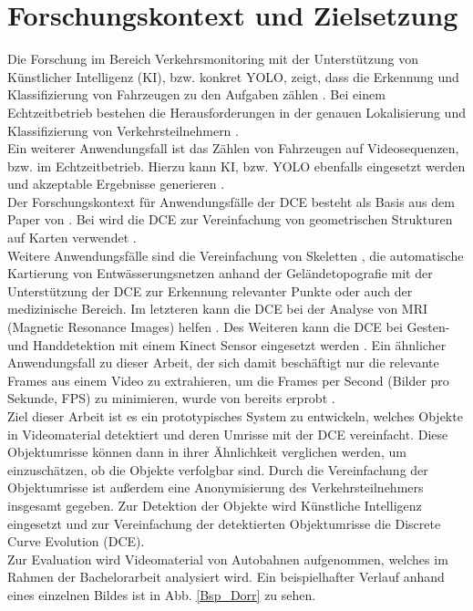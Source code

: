 \section{Forschungskontext und Zielsetzung}
{%

Die Forschung im Bereich Verkehrsmonitoring mit der Unterstützung von Künstlicher Intelligenz (KI), bzw. konkret YOLO, zeigt, dass die Erkennung und Klassifizierung von Fahrzeugen zu den Aufgaben zählen \citep{Lin2021}. Bei einem Echtzeitbetrieb bestehen die Herausforderungen in der genauen Lokalisierung und Klassifizierung von Verkehrsteilnehmern \citep{Lin2021}. \\
Ein weiterer Anwendungsfall ist das Zählen von Fahrzeugen auf Videosequenzen, bzw. im Echtzeitbetrieb. Hierzu kann KI, bzw. YOLO ebenfalls eingesetzt werden und akzeptable Ergebnisse generieren \citep{Al-qaness2021}. \\

Der Forschungskontext für Anwendungsfälle der DCE besteht als Basis aus dem Paper von \citeauthor*{Dorr2015}. Bei \citeauthor*{Barkowsky2000} wird die DCE zur Vereinfachung von geometrischen Strukturen auf Karten verwendet \citep{Barkowsky2000}. \\
Weitere Anwendungsfälle sind die Vereinfachung von Skeletten \citep{Latecki2007}, die automatische Kartierung von Entwässerungsnetzen anhand der Geländetopografie mit der Unterstützung der DCE zur Erkennung relevanter Punkte \citep{ZHENG201517} oder auch der medizinische Bereich. Im letzteren kann die DCE bei der Analyse von MRI (Magnetic Resonance Images) helfen \citep{Supot2007}. Des Weiteren kann die DCE bei Gesten- und Handdetektion mit einem Kinect Sensor eingesetzt werden \citep{Lai2016}. Ein ähnlicher Anwendungsfall zu dieser Arbeit, der sich damit beschäftigt nur die relevante Frames aus einem Video zu extrahieren, um die Frames per Second (\glqq Bilder pro Sekunde\grqq{}, FPS) zu minimieren, wurde von \citeauthor*{Latecki2000a} bereits erprobt \citep{Latecki2000a}. \\

Ziel dieser Arbeit ist es ein prototypisches System zu entwickeln, welches Objekte in Videomaterial detektiert und deren Umrisse mit der DCE vereinfacht. Diese Objektumrisse können dann in ihrer Ähnlichkeit verglichen werden, um einzuschätzen, ob die Objekte verfolgbar sind. Durch die Vereinfachung der Objektumrisse ist außerdem eine Anonymisierung des Verkehrsteilnehmers insgesamt gegeben. Zur Detektion der Objekte wird Künstliche Intelligenz eingesetzt und zur Vereinfachung der detektierten Objektumrisse die Discrete Curve Evolution (DCE). \\
Zur Evaluation wird Videomaterial von Autobahnen aufgenommen, welches im Rahmen der Bachelorarbeit analysiert wird. Ein beispielhafter Verlauf anhand eines einzelnen Bildes ist in Abb. \ref{Bsp_Dorr} zu sehen. \\

}
